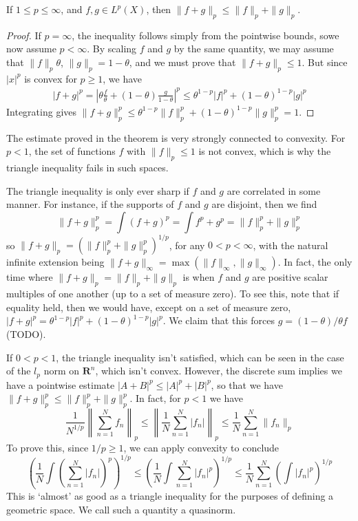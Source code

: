 \begin{theorem}
  If $1 \leq p \leq \infty$, and $f,g \in L^p(X)$, then $\| f + g \|_p \leq \| f \|_p + \| g \|_p$.
\end{theorem}
\begin{proof}
  If $p = \infty$, the inequality follows simply from the pointwise bounds, sowe now assume $p < \infty$. By scaling $f$ and $g$ by the same quantity, we may assume that $\| f \|_p \theta$, $\| g \|_p = 1 - \theta$, and we must prove that $\| f + g \|_p \leq 1$. But since $|x|^p$ is convex for $p \geq 1$, we have
  \begin{align*}
    |f + g|^p = \left| \theta \frac{f}{\theta} + (1 - \theta) \frac{g}{1 - \theta} \right|^p \leq \theta^{1-p} |f|^p + (1-\theta)^{1-p} |g|^p
  \end{align*}
  Integrating gives $\| f + g \|_p^p \leq \theta^{1-p} \| f \|_p^p + (1 - \theta)^{1-p} \| g \|_p^p = 1$.
\end{proof}

\begin{remark}
  The estimate proved in the theorem is very strongly connected to convexity. For $p < 1$, the set of functions $f$ with $\| f \|_p \leq 1$ is not convex, which is why the triangle inequality fails in such spaces.
\end{remark}

The triangle inequality is only ever sharp if $f$ and $g$ are correlated in some manner. For instance, if the supports of $f$ and $g$ are disjoint, then we find
%
\[ \| f + g \|_p^p = \int (f + g)^p = \int f^p + g^p = \| f \|_p^p + \| g \|_p^p \]
%
so $\| f + g \|_p = (\| f \|_p^p + \| g \|_p^p)^{1/p}$, for any $0 < p < \infty$, with the natural infinite extension being $\| f + g \|_\infty = \max(\| f \|_\infty, \| g \|_\infty)$. In fact, the only time where $\| f + g \|_p = \| f \|_p + \| g \|_p$ is when $f$ and $g$ are positive scalar multiples of one another (up to a set of measure zero). To see this, note that if equality held, then we would have, except on a set of measure zero,
$|f + g|^p = \theta^{1-p} |f|^p + (1 - \theta)^{1 -p} |g|^p$. We claim that this forces $g = (1 - \theta)/\theta f$ (TODO).

If $0 < p < 1$, the triangle inequality isn't satisfied, which can be seen in the case of the $l_p$ norm on $\mathbf{R}^n$, which isn't convex. However, the discrete sum implies we have a pointwise estimate $|A + B|^p \leq |A|^p + |B|^p$, so that we have $\| f + g \|_p^p \leq \| f \|_p^p + \| g \|_p^p$. In fact, for $p < 1$ we have
%
\[ \frac{1}{N^{1/p}} \left\| \sum_{n = 1}^N f_n \right\|_p \leq \left\| \frac{1}{N} \sum_{n = 1}^N |f_n| \right\|_p \leq \frac{1}{N} \sum_{n = 1}^N \| f_n \|_p \]
%
To prove this, since $1/p \geq 1$, we can apply convexity to conclude
%
\[ \left( \frac{1}{N} \int \left( \sum_{n = 1}^N |f_n| \right)^p \right)^{1/p} \leq \left( \frac{1}{N} \int \sum_{n = 1}^N |f_n|^p \right)^{1/p} \leq \frac{1}{N} \sum_{n = 1}^N \left( \int |f_n|^p \right)^{1/p} \]
%
This is `almost' as good as a triangle inequality for the purposes of defining a geometric space. We call such a quantity a quasinorm.

